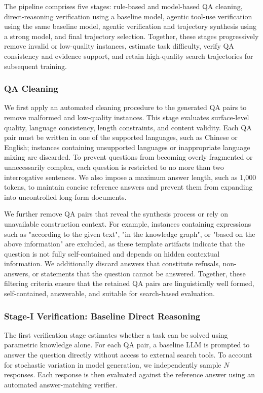 \documentclass{huawei}
\begin{document}
The pipeline comprises five stages: rule-based and model-based QA cleaning, direct-reasoning verification using a baseline model, agentic tool-use verification using the same baseline model, agentic verification and trajectory synthesis using a strong model, and final trajectory selection. Together, these stages progressively remove invalid or low-quality instances, estimate task difficulty, verify QA consistency and evidence support, and retain high-quality search trajectories for subsequent training.



\subsubsection{QA Cleaning}
We first apply an automated cleaning procedure to the generated QA pairs to remove malformed and low-quality instances. This stage evaluates surface-level quality, language consistency, length constraints, and content validity. Each QA pair must be written in one of the supported languages, such as Chinese or English; instances containing unsupported languages or inappropriate language mixing are discarded. To prevent questions from becoming overly fragmented or unnecessarily complex, each question is restricted to no more than two interrogative sentences. We also impose a maximum answer length, such as 1,000 tokens, to maintain concise reference answers and prevent them from expanding into uncontrolled long-form documents.


We further remove QA pairs that reveal the synthesis process or rely on unavailable construction context. For example, instances containing expressions such as "according to the given text", "in the knowledge graph", or "based on the above information" are excluded, as these template artifacts indicate that the question is not fully self-contained and depends on hidden contextual information. We additionally discard answers that constitute refusals, non-answers, or statements that the question cannot be answered. Together, these filtering criteria ensure that the retained QA pairs are linguistically well formed, self-contained, answerable, and suitable for search-based evaluation.


\subsubsection{Stage-I Verification: Baseline Direct Reasoning}
The first verification stage estimates whether a task can be solved using parametric knowledge alone. For each QA pair, a baseline LLM is prompted to answer the question directly without access to external search tools. To account for stochastic variation in model generation, we independently sample $N$ responses. Each response is then evaluated against the reference answer using an automated answer-matching verifier.
\end{document}

